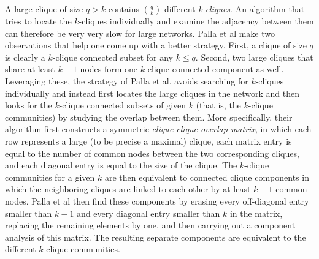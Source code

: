 A large clique of size $q >k $ contains $\binom{q}{k}$ different {\em k-cliques}.
An algorithm that tries to locate the $k$-cliques individually and examine the adjacency
between them can therefore be very very slow for large networks. 
Palla et al make two observations that help one come up with a better strategy.
First, a clique of size $q$ is clearly a $k$-clique connected subset for any $k \leq q$. 
Second, two large cliques that share at least $k-1$ nodes form one $k$-clique connected component as well.
Leveraging these, the strategy of Palla et al. avoids searching for $k$-cliques individually
and instead first locates the large cliques in the network and then looks for the $k$-clique connected subsets of given $k$ (that is, the $k$-clique communities) by studying the overlap between them.
More specifically, their algorithm first constructs a symmetric {\em clique-clique overlap matrix}, 
in which each row represents a large (to be precise a maximal) clique, 
each matrix entry is equal to the number of common nodes between the two corresponding cliques, and each diagonal entry is equal to the size of the clique. 
The $k$-clique communities for a given $k$ are then equivalent to connected 
clique components in which the neighboring cliques are linked to each other by at least $k-1$ common nodes. Palla et al then find these components by erasing every off-diagonal entry smaller than $k-1$ and every diagonal entry smaller than $k$ in the matrix, replacing the remaining elements by one, and then carrying out a component analysis of this matrix. The resulting separate components are equivalent to the different $k$-clique communities.
       




